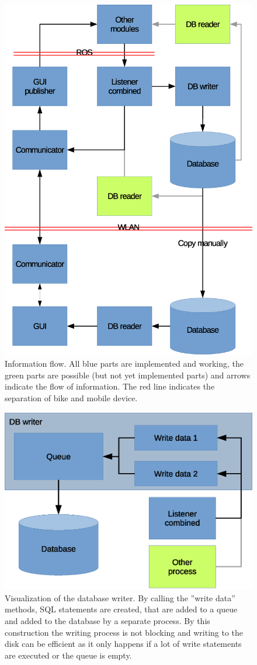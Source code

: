 \documentclass[]{scrreprt}
\begin{document}
	\begin{figure}[H]
		\centering
		\includegraphics[width=0.8\linewidth]{images/dataFlow.eps}
		\caption[Information flow]{Information flow. All blue parts are implemented and working, the green parts are possible (but not yet implemented parts) and arrows indicate the flow of information. The red line indicates the separation of bike and mobile device.}
		\label{fig:dataFlow}
	\end{figure}

	\begin{figure}[H]
		\centering
		\includegraphics[width=12.64cm]{images/dbWriter.eps}
		\caption[Database writer]{Visualization of the database writer. By calling the ''write data'' methods, SQL statements are created, that are added to a queue and added to the database by a separate process. By this construction the writing process is not blocking and writing to the disk can be efficient as it only happens if a lot of write statements are executed or the queue is empty.}
		\label{fig:DBwriter}
	\end{figure}
	
\end{document}
